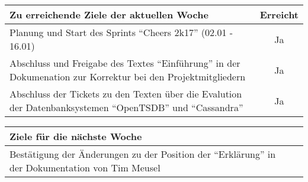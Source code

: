 \begin{tabularx}{\textwidth}{Xc}
    \arrayrulecolor{OliveGreen}
    \toprule
    {\bfseries Zu erreichende Ziele der aktuellen Woche} & {\bfseries Erreicht} \\
    \midrule[2pt]
    Planung und Start des Sprints ``Cheers 2k17'' (02.01 - 16.01)  &  Ja  \\
    \rowcolor{OliveGreen!15}
    Abschluss und Freigabe des Textes ``Einführung'' in der
    Dokumenation zur Korrektur bei den Projektmitgliedern  &  Ja  \\
    \rowcolor{White}
    Abschluss der Tickets zu den Texten über die Evalution der
    Datenbanksystemen ``OpenTSDB'' und ``Cassandra''  &  Ja  \\
    \bottomrule[2pt]
\end{tabularx}
%
\vspace{1cm}
%
\begin{tabularx}{\textwidth}{Xc}
    \arrayrulecolor{OliveGreen}
    \toprule
    {\bfseries Ziele für die nächste Woche}              &                   \\
    \midrule[2pt]
    Bestätigung der Änderungen zu der Position der ``Erklärung'' in der
    Dokumentation von Tim Meusel  &  \\
\end{tabularx}

